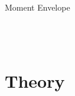 \documentclass[10pt]{beamer}
\begin{document}
\begin{frame}{Moment Envelope}
\begin{columns}[c,onlytextwidth]
\begin{figure}[t]
\begin{subfigure}[b]{0.49\textwidth}
        \caption{}
      \end{subfigure}
    \end{figure}
  \end{columns}
\end{frame}

\section{Theory}
\end{document}
